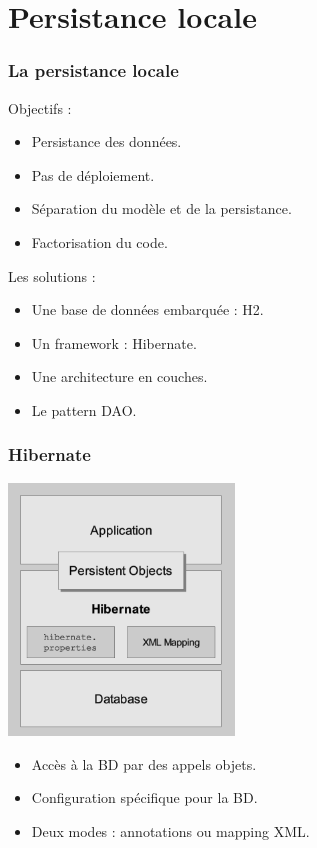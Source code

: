 \section{Persistance locale}

\begin{frame}
\frametitle{La persistance locale}
Objectifs :
\begin{itemize}
\item Persistance des donn\'ees.
\item Pas de d\'eploiement.
\item S\'eparation du mod\`ele et de la persistance.
\item Factorisation du code.
\end{itemize}
\pause
Les solutions :
\begin{itemize}
\item Une base de donn\'ees embarqu\'ee : H2.
\item Un framework : Hibernate.
\item Une architecture en couches.
\item Le pattern DAO.
\end{itemize}
\end{frame}

\begin{frame}
\frametitle{Hibernate}
\begin{center}
\includegraphics[width=6cm]{images/HibernateArchi}
\end{center}
\end{frame}

\begin{frame}
\begin{itemize}
\item Acc\`es \`a la BD par des appels objets.
\item Configuration sp\'ecifique pour la BD.
\item Deux modes : annotations ou mapping XML.
\end{itemize}
\end{frame}


